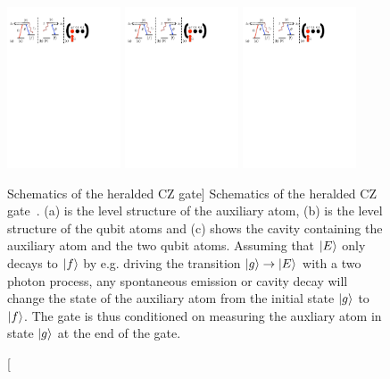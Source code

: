 \begin{figure}
\centering
\includegraphics[width=0.3\textwidth]{./figs_Borregaard_PRA2015/figure3a}
\includegraphics[width=0.3\textwidth]{./figs_Borregaard_PRA2015/figure3b}
\includegraphics[width=0.3\textwidth]{./figs_Borregaard_PRA2015/figure3c}
\caption
[Schematics of the heralded CZ gate]
{ Schematics of the heralded CZ gate~\cite{johannes}. (a) is the level
structure of the auxiliary atom, (b) is the level structure of the qubit atoms
and (c) shows the cavity containing the auxiliary atom and the two qubit atoms.
Assuming that $| E \rangle$ only decays to $| f \rangle$ by e.g. driving the transition
$| g \rangle\to| E \rangle$ with a two photon process, any spontaneous emission or
cavity decay will change the state of the auxiliary atom from the initial state
$| g \rangle$ to $| f \rangle$. The gate is thus conditioned on measuring the auxliary
atom in state $| g \rangle$ at the end of the gate.}
\label{fig:figure3}
\end{figure}

